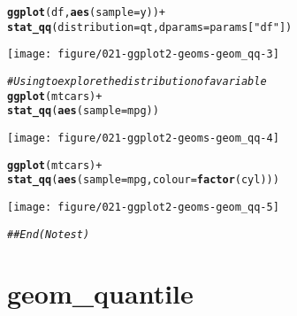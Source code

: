 \documentclass[a4paper,titlepage]{tufte-handout}\usepackage[]{graphicx}\usepackage[]{color}
\makeatletter
\def\maxwidth{ %
  \ifdim\Gin@nat@width>\linewidth
    \linewidth
  \else
    \Gin@nat@width
  \fi
}
\newcommand{\hlstr}[1]{\textcolor[rgb]{0.192,0.494,0.8}{#1}}%
\newcommand{\hlcom}[1]{\textcolor[rgb]{0.678,0.584,0.686}{\textit{#1}}}%
\newcommand{\hlopt}[1]{\textcolor[rgb]{0,0,0}{#1}}%
\newcommand{\hlstd}[1]{\textcolor[rgb]{0.345,0.345,0.345}{#1}}%
\newcommand{\hlkwc}[1]{\textcolor[rgb]{0.333,0.667,0.333}{#1}}%
\newcommand{\hlkwd}[1]{\textcolor[rgb]{0.737,0.353,0.396}{\textbf{#1}}}%
\newenvironment{kframe}{%
 \def\at@end@of@kframe{}%
 \ifinner\ifhmode%
  \def\at@end@of@kframe{\end{minipage}}%
  \begin{minipage}{\columnwidth}%
 \fi\fi%
 \def\FrameCommand##1{\hskip\@totalleftmargin \hskip-\fboxsep
 \colorbox{shadecolor}{##1}\hskip-\fboxsep
     \hskip-\linewidth \hskip-\@totalleftmargin \hskip\columnwidth}%
 \MakeFramed {\advance\hsize-\width
   \@totalleftmargin\z@ \linewidth\hsize
   \@setminipage}}%
 {\par\unskip\endMakeFramed%
 \at@end@of@kframe}
\newenvironment{knitrout}{}{} %
\makeatother
\begin{document}
\begin{knitrout}
\begin{kframe}
{\ttfamily\noindent\color{warningcolor}{\#\# Warning in log(s): NaNs produced}}\begin{alltt}
\hlkwd{ggplot}\hlstd{(df,} \hlkwd{aes}\hlstd{(}\hlkwc{sample} \hlstd{= y))} \hlopt{+}
  \hlkwd{stat_qq}\hlstd{(}\hlkwc{distribution} \hlstd{= qt,} \hlkwc{dparams} \hlstd{= params[}\hlstr{"df"}\hlstd{])}
\end{alltt}
\end{kframe}
\texttt{[image: figure/021-ggplot2-geoms-geom\_qq-3]} 
\begin{kframe}\begin{alltt}
\hlcom{# Using to explore the distribution of a variable}
\hlkwd{ggplot}\hlstd{(mtcars)} \hlopt{+}
  \hlkwd{stat_qq}\hlstd{(}\hlkwd{aes}\hlstd{(}\hlkwc{sample} \hlstd{= mpg))}
\end{alltt}
\end{kframe}
\texttt{[image: figure/021-ggplot2-geoms-geom\_qq-4]} 
\begin{kframe}\begin{alltt}
\hlkwd{ggplot}\hlstd{(mtcars)} \hlopt{+}
  \hlkwd{stat_qq}\hlstd{(}\hlkwd{aes}\hlstd{(}\hlkwc{sample} \hlstd{= mpg,} \hlkwc{colour} \hlstd{=} \hlkwd{factor}\hlstd{(cyl)))}
\end{alltt}
\end{kframe}
\texttt{[image: figure/021-ggplot2-geoms-geom\_qq-5]} 
\begin{kframe}\begin{alltt}
\hlcom{## End(No test)}
\end{alltt}
\end{kframe}
\end{knitrout}


\section{geom\_quantile}
\end{document}
